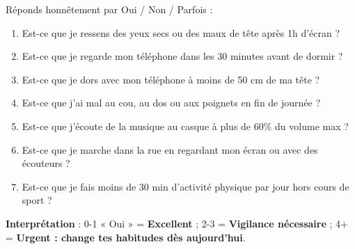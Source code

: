 \documentclass[11pt]{article}
\begin{document}
\begin{methode}
Réponds honnêtement par Oui / Non / Parfois :
\begin{enumerate}
    \item Est-ce que je ressens des yeux secs ou des maux de tête après 1h d'écran ?
    \item Est-ce que je regarde mon téléphone dans les 30 minutes avant de dormir ?
    \item Est-ce que je dors avec mon téléphone à moins de 50 cm de ma tête ?
    \item Est-ce que j'ai mal au cou, au dos ou aux poignets en fin de journée ?
    \item Est-ce que j'écoute de la musique au casque à plus de 60\% du volume max ?
    \item Est-ce que je marche dans la rue en regardant mon écran ou avec des écouteurs ?
    \item Est-ce que je fais moins de 30 min d'activité physique par jour hors cours de sport ?
\end{enumerate}
\textbf{Interprétation} : 0-1 « Oui » = \textbf{Excellent} ; 2-3 = \textbf{Vigilance nécessaire} ; 4+ = \textbf{Urgent : change tes habitudes dès aujourd'hui}.
\end{methode}
\end{document}
